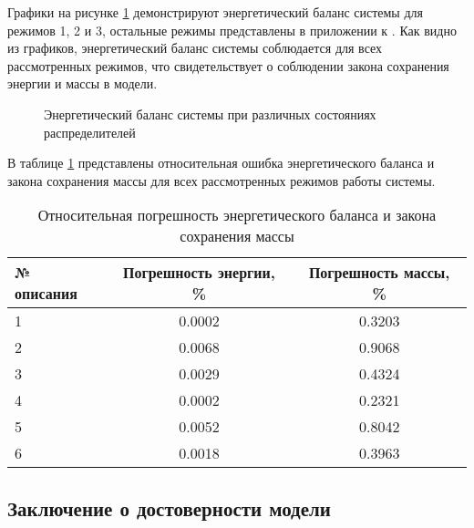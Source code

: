 Графики на рисунке \ref{fig:ch2/energy_balance} демонстрируют энергетический баланс системы для режимов 1, 2 и 3, остальные
режимы представлены в приложении к . Как видно из графиков, энергетический баланс системы соблюдается
для всех рассмотренных режимов, что свидетельствует о соблюдении закона сохранения энергии и массы в модели.

\begin{figure}[ht]
    \caption{Энергетический баланс системы при различных состояниях распределителей}
    \label{fig:ch2/energy_balance}

\end{figure}

В таблице \ref{tab:ch2/energy_balance} представлены относительная ошибка
энергетического баланса и закона сохранения массы
для всех рассмотренных режимов работы системы.

\begin{table}[h]
    \centering
    \caption{Относительная погрешность энергетического баланса и закона сохранения массы}
    \begin{tabular}{l|c|c}
        \midrule
        № описания & Погрешность энергии, \% & Погрешность массы, \% \\
        \midrule
        1          & 0.0002                  & 0.3203                \\
        \hline
        2          & 0.0068                  & 0.9068                \\
        \hline
        3          & 0.0029                  & 0.4324                \\
        \hline
        4          & 0.0002                  & 0.2321                \\
        \hline
        5          & 0.0052                  & 0.8042                \\
        \hline
        6          & 0.0018                  & 0.3963                \\
        \midrule
    \end{tabular}
    \label{tab:ch2/energy_balance}
\end{table}



\subsection{Заключение о достоверности модели}\label{sec:ch2/sec7/subsec5}
